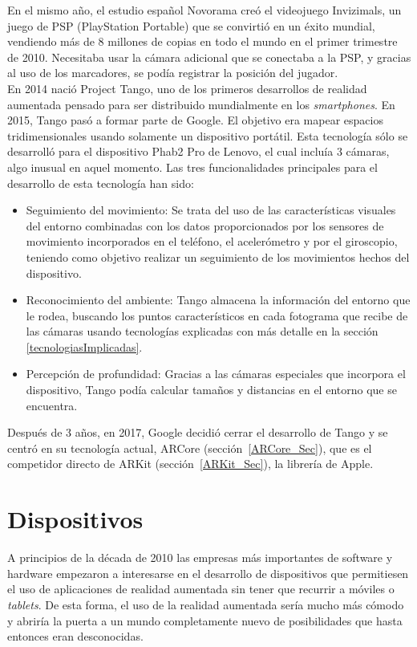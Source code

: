 
En el mismo año, el estudio español Novorama creó el videojuego Invizimals, un juego de PSP (PlayStation Portable) que se convirtió en un éxito mundial, vendiendo más de 8 millones de copias en todo el mundo en el primer trimestre de 2010. Necesitaba usar la cámara adicional que se conectaba a la PSP, y gracias al uso de los marcadores, se podía registrar la posición del jugador.\\

En 2014 nació Project Tango, uno de los primeros desarrollos de realidad aumentada pensado para ser distribuido mundialmente en los \textit{smartphones}. En 2015, Tango pasó a formar parte de Google. El objetivo era mapear espacios tridimensionales usando solamente un dispositivo portátil. Esta tecnología sólo se desarrolló para el dispositivo Phab2 Pro de Lenovo, el cual incluía 3 cámaras, algo inusual en aquel momento.
Las tres funcionalidades principales para el desarrollo de esta tecnología han sido:
\begin{itemize}
\item Seguimiento del movimiento: Se trata del uso de las características visuales del entorno combinadas con los datos proporcionados por los sensores de movimiento incorporados en el teléfono, el acelerómetro y por el giroscopio, teniendo como objetivo realizar un seguimiento de los movimientos hechos del dispositivo. 
\item Reconocimiento del ambiente: Tango almacena la información del entorno que le rodea, buscando los puntos característicos en cada fotograma que recibe de las cámaras usando tecnologías explicadas con más detalle en la sección \ref{tecnologiasImplicadas}.
\item Percepción de profundidad: Gracias a las cámaras especiales que incorpora el dispositivo, Tango podía calcular tamaños y distancias en el entorno que se encuentra. 
\end{itemize}
Después de 3 años, en 2017, Google decidió cerrar el desarrollo de Tango y se centró en su tecnología actual, ARCore (sección~\ref{ARCore_Sec}), que es el competidor directo de ARKit (sección~\ref{ARKit_Sec}), la librería de Apple.

\newpage
\section{Dispositivos}
A principios de la década de 2010 las empresas más importantes de software y hardware empezaron a interesarse en el desarrollo de dispositivos que permitiesen el uso de aplicaciones de realidad aumentada sin tener que recurrir a móviles o \textit{tablets}. De esta forma, el uso de la realidad aumentada sería mucho más cómodo y abriría la puerta a un mundo completamente nuevo de posibilidades que hasta entonces eran desconocidas. 


